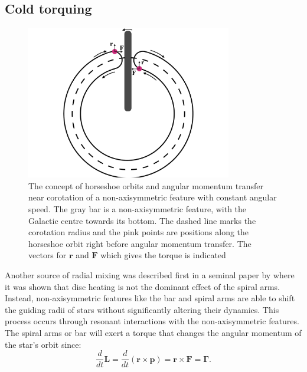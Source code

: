 \subsection{Cold torquing}
\begin{figure}[t]
    \centering
    \includegraphics[width=0.8\textwidth]{images/torquing.pdf}
    \caption{The concept of horseshoe orbits and angular momentum transfer near corotation of a non-axisymmetric feature with constant angular speed. The gray bar is a non-axisymmetric feature, with the Galactic centre towards its bottom. The dashed line marks the corotation radius and the pink points are positions along the horseshoe orbit right before angular momentum transfer. The vectors for $\bm{r}$ and $\bm{F}$ which gives the torque is indicated} %
    \label{fig:torquing}
\end{figure}
Another source of radial mixing was described first in a seminal paper by \cite{sellwood:02} where it was shown that disc heating is not the dominant effect of the spiral arms. Instead, non-axisymmetric features like the bar and spiral arms are able to shift the guiding radii of stars without significantly altering their dynamics. This process occurs through resonant interactions with the non-axisymmetric features. The spiral arms or bar will exert a torque that changes the angular momentum of the star's orbit since:
\begin{equation}
    \frac{d}{dt}\bm{L} = \frac{d}{dt}(\bm{r}\times\bm{p}) = \bm{r}\times\bm{F} = \bm{\Gamma}.
\end{equation}
